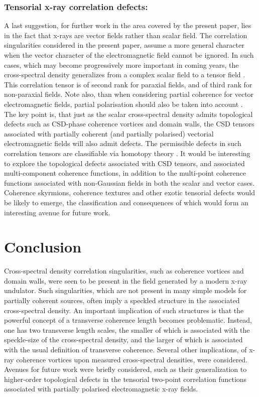 \documentclass{iucr}              %
\begin{document}
\subsubsection{Tensorial x-ray correlation defects:} A last suggestion, for further work in the area covered by the present paper, lies in the fact that x-rays are vector fields rather than scalar field.  The correlation singularities considered in the present paper, assume a more general character when the vector character of the electromagnetic field cannot be ignored.  In such cases, which may become progressively more important in coming years, the cross-spectral density generalizes from a complex scalar field to a tensor field \cite{mandel_wolf,wolf_thin_book}.  This correlation tensor is of second rank for paraxial fields, and of third rank for non-paraxial fields.  Note also, than when considering partial coherence for vector electromagnetic fields, partial polarisation should also be taken into account \cite{wolf_thin_book}.  The key point is, that just as the scalar cross-spectral density admits topological defects such as CSD-phase coherence vortices and domain walls, the CSD tensors associated with partially coherent (and partially polarised) vectorial electromagnetic fields will also admit defects.  The permissible defects in such correlation tensors are classifiable via homotopy theory \cite{VilenkinShellard1994,Volovik2003}.  It would be interesting to explore the topological defects associated with CSD tensors, and associated multi-component coherence functions, in addition to the multi-point coherence functions associated with non-Gaussian fields in both the scalar and vector cases.  Coherence skyrmions, coherence textures and other exotic tensorial defects would be likely to emerge, the classification and consequences of which would form an interesting avenue for future work.

\section{Conclusion}

Cross-spectral density correlation singularities, such as coherence vortices and domain walls, were seen to be present in the field generated by a modern x-ray undulator.  Such singularities, which are not present in many simple models for partially coherent sources, often imply a speckled structure in the associated cross-spectral density.  An important implication of such structures is that the powerful concept of a transverse coherence length becomes problematic.  Instead, one has two transverse length scales, the smaller of which is associated with the speckle-size of the cross-spectral density, and the larger of which is associated with the usual definition of transverse coherence.  Several other implications, of x-ray coherence vortices upon measured cross-spectral densities, were considered.   Avenues for future work were briefly considered, such as their generalization to higher-order topological defects in the tensorial two-point correlation functions associated with partially polarised electromagnetic x-ray fields.
\end{document}
